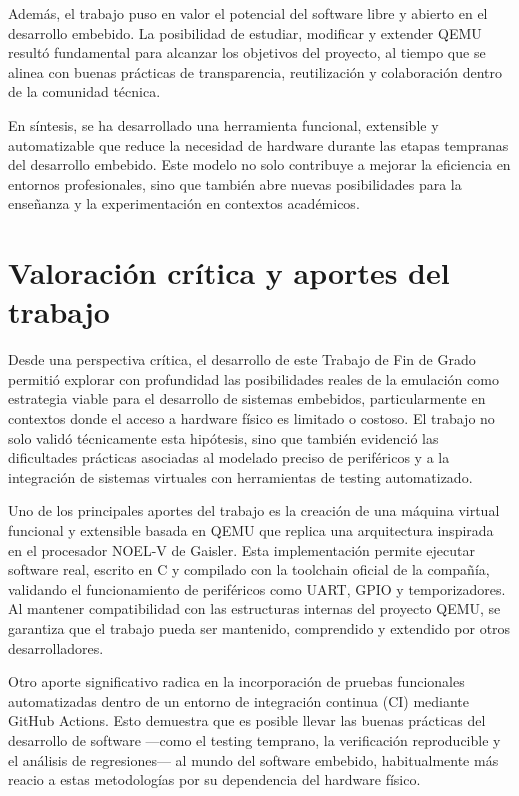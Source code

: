 Además, el trabajo puso en valor el potencial del software libre y abierto en el desarrollo embebido. La posibilidad de estudiar, modificar y extender QEMU resultó fundamental para alcanzar los objetivos del proyecto, al tiempo que se alinea con buenas prácticas de transparencia, reutilización y colaboración dentro de la comunidad técnica.

En síntesis, se ha desarrollado una herramienta funcional, extensible y automatizable que reduce la necesidad de hardware durante las etapas tempranas del desarrollo embebido. Este modelo no solo contribuye a mejorar la eficiencia en entornos profesionales, sino que también abre nuevas posibilidades para la enseñanza y la experimentación en contextos académicos.

\section{Valoración crítica y aportes del trabajo}

Desde una perspectiva crítica, el desarrollo de este Trabajo de Fin de Grado permitió explorar con profundidad las posibilidades reales de la emulación como estrategia viable para el desarrollo de sistemas embebidos, particularmente en contextos donde el acceso a hardware físico es limitado o costoso. El trabajo no solo validó técnicamente esta hipótesis, sino que también evidenció las dificultades prácticas asociadas al modelado preciso de periféricos y a la integración de sistemas virtuales con herramientas de testing automatizado.

Uno de los principales aportes del trabajo es la creación de una máquina virtual funcional y extensible basada en QEMU que replica una arquitectura inspirada en el procesador NOEL-V de Gaisler. Esta implementación permite ejecutar software real, escrito en C y compilado con la toolchain oficial de la compañía, validando el funcionamiento de periféricos como UART, GPIO y temporizadores. Al mantener compatibilidad con las estructuras internas del proyecto QEMU, se garantiza que el trabajo pueda ser mantenido, comprendido y extendido por otros desarrolladores.

Otro aporte significativo radica en la incorporación de pruebas funcionales automatizadas dentro de un entorno de integración continua (CI) mediante GitHub Actions. Esto demuestra que es posible llevar las buenas prácticas del desarrollo de software —como el testing temprano, la verificación reproducible y el análisis de regresiones— al mundo del software embebido, habitualmente más reacio a estas metodologías por su dependencia del hardware físico.

